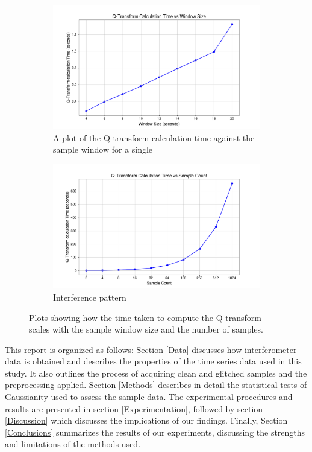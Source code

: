 \documentclass[12pt]{article}
\begin{document}
\begin{figure}[H]
  \centering
  \begin{subfigure}[t]{0.65\textwidth}
    \centering
    \includegraphics[width=\textwidth]{images/q_transform_time_vs_window_size.pdf}
    \caption{A plot of the Q-transform calculation time against the sample window for a single  }
    \label{fig:qtransform_vs_windowsize}
  \end{subfigure}
  \hspace{25px}
  \begin{subfigure}[t]{0.65\textwidth}
    \centering
    \includegraphics[width=\textwidth]{images/q_transform_time_vs_sample_count.pdf}
    \caption{Interference pattern}
    \label{fig:qtransform_vs_samplecount}
  \end{subfigure}
  \caption{Plots showing how the time taken to compute the Q-transform scales with the sample window size and the number of samples.}
\end{figure}

\noindent This report is organized as follows: Section \ref{Data} discusses how interferometer data is obtained and describes the properties of the time series data used in this study. It also outlines the process of acquiring clean and glitched samples and the preprocessing applied. Section \ref{Methods} describes in detail the statistical tests of Gaussianity used to assess the sample data. The experimental procedures and results are presented in section \ref{Experimentation}, followed by section \ref{Discussion} which discusses the implications of our findings. Finally, Section \ref{Conclusions} summarizes the results of our experiments, discussing the strengths and limitations of the methods used.
\end{document}
